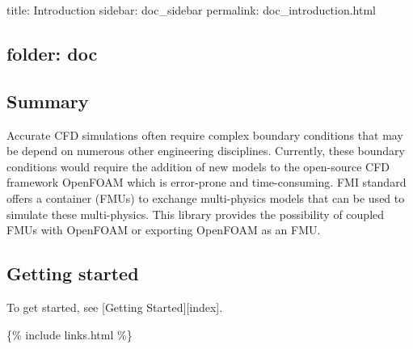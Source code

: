 

 title\+: Introduction sidebar\+: doc\+\_\+sidebar permalink\+: doc\+\_\+introduction.\+html \subsection*{folder\+: doc }

\subsection*{Summary}

Accurate C\+FD simulations often require complex boundary conditions that may be depend on numerous other engineering disciplines. Currently, these boundary conditions would require the addition of new models to the open-\/source C\+FD framework Open\+F\+O\+AM which is error-\/prone and time-\/consuming. F\+MI standard offers a container (F\+M\+Us) to exchange multi-\/physics models that can be used to simulate these multi-\/physics. This library provides the possibility of coupled F\+M\+Us with Open\+F\+O\+AM or exporting Open\+F\+O\+AM as an F\+MU.

\subsection*{Getting started}

To get started, see \mbox{[}Getting Started\mbox{]}\mbox{[}index\mbox{]}.

\{\% include links.\+html \%\} 